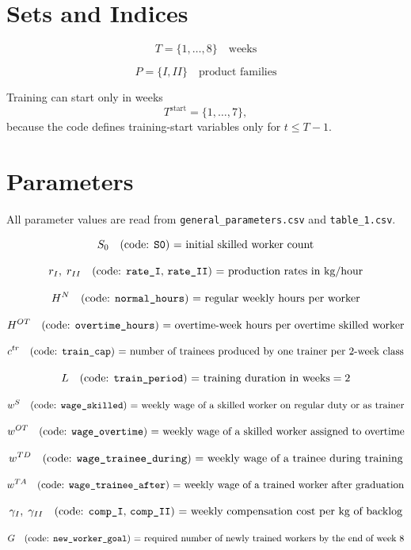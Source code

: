 \section*{Sets and Indices}

\[
T=\{1,\dots,8\} \quad \text{weeks}
\]

\[
P=\{I,II\} \quad \text{product families}
\]

Training can start only in weeks
\[
T^{\text{start}}=\{1,\dots,7\},
\]
because the code defines training-start variables only for \(t\le T-1\).

\section*{Parameters}

All parameter values are read from \texttt{general\_parameters.csv} and \texttt{table\_1.csv}.

\[
S_0 \quad \text{(code: \texttt{S0}) = initial skilled worker count}
\]

\[
r_I,\; r_{II} \quad \text{(code: \texttt{rate\_I}, \texttt{rate\_II}) = production rates in kg/hour}
\]

\[
H^N \quad \text{(code: \texttt{normal\_hours}) = regular weekly hours per worker}
\]

\[
H^{OT} \quad \text{(code: \texttt{overtime\_hours}) = overtime-week hours per overtime skilled worker}
\]

\[
c^{tr} \quad \text{(code: \texttt{train\_cap}) = number of trainees produced by one trainer per 2-week class}
\]

\[
L \quad \text{(code: \texttt{train\_period}) = training duration in weeks} = 2
\]

\[
w^S \quad \text{(code: \texttt{wage\_skilled}) = weekly wage of a skilled worker on regular duty or as trainer}
\]

\[
w^{OT} \quad \text{(code: \texttt{wage\_overtime}) = weekly wage of a skilled worker assigned to overtime}
\]

\[
w^{TD} \quad \text{(code: \texttt{wage\_trainee\_during}) = weekly wage of a trainee during training}
\]

\[
w^{TA} \quad \text{(code: \texttt{wage\_trainee\_after}) = weekly wage of a trained worker after graduation}
\]

\[
\gamma_I,\; \gamma_{II} \quad \text{(code: \texttt{comp\_I}, \texttt{comp\_II}) = weekly compensation cost per kg of backlog}
\]

\[
G \quad \text{(code: \texttt{new\_worker\_goal}) = required number of newly trained workers by the end of week 8}
\]

